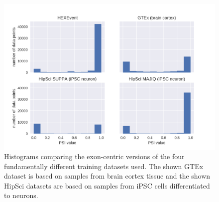 \begin{figure}
	\centering\includegraphics[width=1\textwidth]{../visualizations/ch4-methods/dataset_histograms_seaborn.png} 
	\caption[test.]{
		Histograms comparing the exon-centric versions of the four fundamentally different training datasets used. The shown GTEx dataset is based on samples from brain cortex tissue and the shown HipSci datasets are based on samples from iPSC cells differentiated to neurons. 
	}
	\label{fig:datahistograms}
\end{figure}

